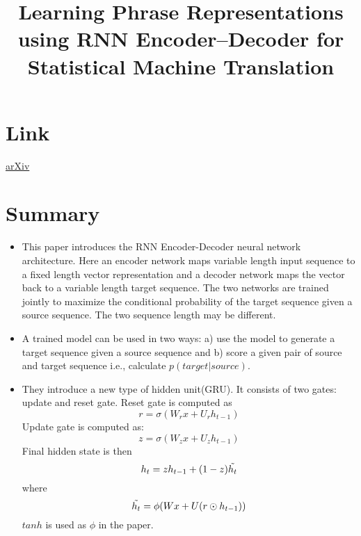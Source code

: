 \documentclass{article}
\title{Learning Phrase Representations using RNN Encoder–Decoder
for Statistical Machine Translation}
\author{}
\date{}
\begin{document}
\maketitle

\section*{Link}
\href{https://arxiv.org/abs/1406.1078}{arXiv} 

\section*{Summary}
\begin{itemize}
    \item This paper introduces the RNN Encoder-Decoder neural network architecture. Here an encoder network maps variable length input sequence to a fixed length vector representation and a decoder network maps the vector back to a variable length target sequence. The two networks are trained jointly to maximize the conditional probability of the target sequence given a source sequence. The two sequence length may be different.
    \item A trained model can be used in two ways: a) use the model to generate a target sequence given a source sequence and b) score a given pair of source and target sequence i.e., calculate $p(target|source)$.
    \item They introduce a new type of hidden unit(GRU). It consists of two gates: update and reset gate. Reset gate is computed as
    \begin{equation*}
        r = \sigma (W_r x + U_r h_{t-1})
    \end{equation*}
    Update gate is computed as:
    \begin{equation*}
        z = \sigma (W_z x + U_z h_{t-1})
    \end{equation*}
    Final hidden state is then 
    \begin{equation*}
        h_t = z h_{t-1} + (1-z)\Tilde{h_t}
    \end{equation*}
    where 
    \begin{equation*}
        \Tilde{h_t} = \phi(Wx+U(r\odot h_{t-1}))
    \end{equation*}
    $tanh$ is used as $\phi$ in the paper. 
    

\end{itemize}
\end{document}
